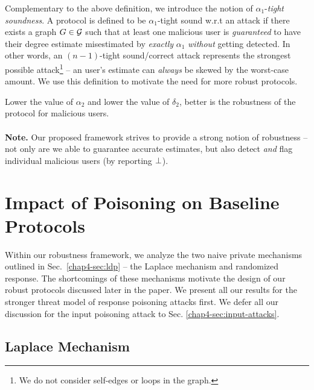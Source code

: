 Complementary to the above definition, we introduce the notion of $\alpha_1$-\textit{tight soundness}. A protocol is defined to be $\alpha_1$-tight sound w.r.t an attack if there exists a graph $G \in \mathcal{G}$ such that at least one malicious user is \textit{guaranteed} to have their degree estimate misestimated by \textit{exactly} $\alpha_1$ \textit{without} getting detected.  %
In other words, an $(n-1)$-tight sound/correct attack represents the strongest possible attack\footnote{We do not consider self-edges or loops in the graph.} -- an user's estimate can \textit{always} be skewed by the worst-case amount. We use this definition to motivate the need for more robust protocols. %
\par Lower the value of
$\alpha_2$ and lower the value of $\delta_2$, better is the robustness of the protocol for malicious users.  
  \vspace{-0.2cm}  \\\\
\noindent\textbf{Note.} Our proposed  framework strives to provide a strong notion of robustness -- not only are we able to guarantee accurate estimates, but also detect  \textit{and} flag individual malicious users (by reporting $\perp$). %
\section{Impact of Poisoning on Baseline Protocols}

Within our robustness framework, we analyze the two naive private mechanisms outlined in Sec.~\ref{chap4-sec:ldp} -- the Laplace mechanism and randomized response. The shortcomings of these mechanisms motivate the design of our robust protocols discussed later in the paper. We present all our results for the stronger threat model of response poisoning attacks first. We defer all our discussion for the input poisoning attack to Sec. \ref{chap4-sec:input-attacks}. 

\subsection{Laplace Mechanism}

